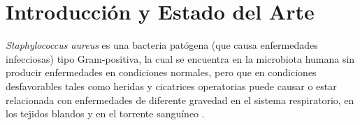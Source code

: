 \documentclass[%
 reprint,
 amsmath,amssymb,
 aps,
]{revtex4-2}
\begin{document}
\begin{abstract}
\end{abstract}

\keywords{}%
\maketitle


\section{\label{sec:intro}Introducci\'{o}n y Estado del Arte}
\textit{Staphylococcus aureus} es una bacteria pat\'{o}gena (que causa enfermedades infecciosas) tipo Gram-positiva,  la cual se encuentra en la microbiota humana sin producir enfermedades en condiciones normales, pero que en condiciones desfavorables tales como heridas y cicatrices operatorias puede causar o estar relacionada con enfermedades de diferente gravedad en el sistema respiratorio, en los tejidos blandos y en el torrente sangu\'{i}neo \cite{1HarpavatS.NissimS.LipppincottsMicrocards:MicrobiologyFlashCards2012.}.\\
\end{document}

